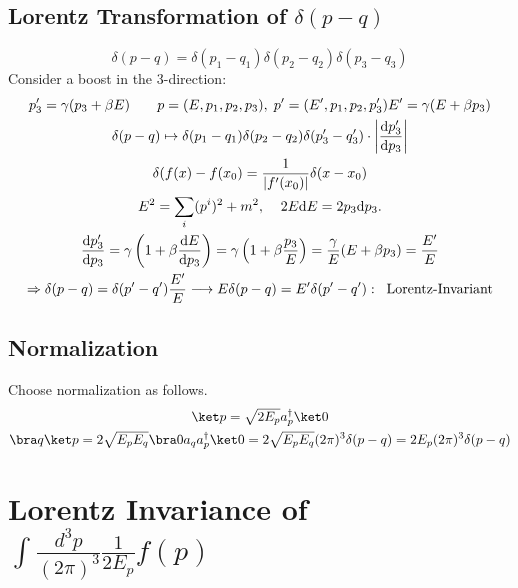 \documentclass[]{scrartcl}
\begin{document}
\subsection{Lorentz Transformation of $\delta(p-q)$}
\begin{equation}
	\delta(p-q) = \delta(p_1 - q_1)\delta(p_2 - q_2)\delta(p_3 - q_3)
\end{equation}
Consider a boost in the 3-direction:
\begin{gather}
	p_3' = \gamma(p_3 + \beta E)\;\;\;\;\;\;\; p = (E,p_1,p_2,p_3),\; p' = (E', p_1, p_2, p_3')
	E' = \gamma(E + \beta p_3)\\
	\delta(p-q) \mapsto \delta(p_1-q_1)\delta(p_2-q_2)\delta(p_3'-q_3')\cdot\biggl\rvert \frac{\text d p_3'}{\text d p_3}\biggr\rvert\\
	\delta(f(x) - f(x_0) = \frac{1}{|f'(x_0)|}\delta(x-x_0)\\
	E^2 = \sum_i (p^i)^2 + m^2, \;\;\;\; 2E \text d E = 2p_3\text d p_3.\\
	\frac{\text dp_3'}{\text dp_3} = \gamma\left( 1 + \beta \frac{\text d E}{\text d p_3} \right) = \gamma\left( 1+ \beta\frac{p_3}{E} \right) = \frac{\gamma}{E}(E + \beta p_3) = \frac{E'}{E}\\
	\Rightarrow \delta(p-q) = \delta(p'-q')\frac{E'}{E} \longrightarrow E\delta(p-q) = E'\delta(p'-q'):\;\;\text{Lorentz-Invariant}
\end{gather}

\subsection{Normalization}
Choose normalization as follows.
\begin{gather}
	\ket p = \sqrt{2 E_p}a_p^\dagger \ket 0\\
	\bra q \ket p = 2\sqrt{E_pE_q}\bra 0 a_q a_p^\dagger \ket 0 = 2\sqrt{E_pE_q}(2\pi)^3\delta(p-q) = 2E_p(2\pi)^3\delta(p-q)
\end{gather}

\section{Lorentz Invariance of $\int \frac{d^3 p}{(2\pi)^3}\frac{1}{2E_p}f(p)$}
\end{document}
